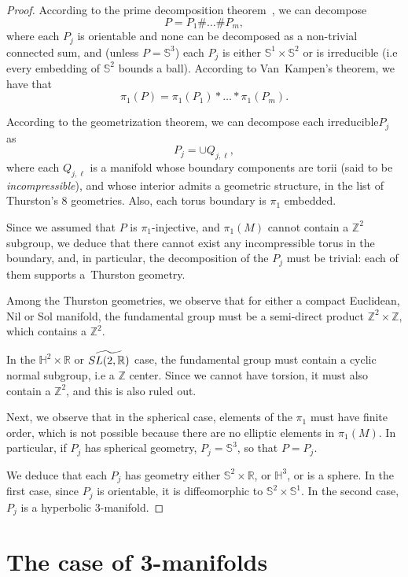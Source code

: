 \documentclass[AHL,Unicode,longabstracts,published]{cedram}
\newcommand{\R}{\mathbb{R}}
\newcommand{\Ss}{\mathbb{S}}
\newcommand{\Z}{\mathbb{Z}}
\newcommand{\Hh}{\mathbb{H}}
\theoremstyle{plain}
\let\oldtilde\tilde
\renewcommand*{\tilde}[1]{\mathchoice{\widetilde{#1}}{\widetilde{#1}}{\oldtilde{#1}}{\oldtilde{#1}}}
\begin{document}
\begin{proof}
According to the prime decomposition theorem~\cite{Milnor}, we can decompose
\[
P = P_1 \# \dots \# P_m,
\]
where each $P_j$ is orientable and none can be decomposed as a non-trivial connected sum, and (unless $P= \Ss^3$) each $P_j$ is either $\Ss^1\times\Ss^2$ or is irreducible (i.e every embedding of $\Ss^2$ bounds a ball). According to Van~Kampen's theorem, we have that
\[
\pi_1(P)= \pi_1(P_1)\ast \dots \ast \pi_1(P_m).
\]

According to the geometrization theorem, we can decompose each irreducible\linebreak $P_j$ as
\[
P_j = \cup Q_{j,\ell},
\]
where each $Q_{j,\ell}$ is a manifold whose boundary components are torii (said to be \emph{incompressible}), and whose interior admits a geometric structure, in the list of Thurston's 8 geometries. Also, each torus boundary is $\pi_1$ embedded.

Since we assumed that $P$ is $\pi_1$-injective, and $\pi_1(M)$ cannot contain a $\Z^2$ subgroup, we deduce that there cannot exist any incompressible torus in the boundary, and, in particular, the decomposition of the $P_j$ must be trivial: each of them supports a~Thurston geometry.

Among the Thurston geometries, we observe that for either a compact Euclidean, Nil or Sol manifold, the fundamental group must be a semi-direct product $\Z^2 \times \Z$, which contains a $\Z^2$.

In the $\Hh^2\times\R$ or $\tilde{SL(2,\R)}$ case, the fundamental group must contain a cyclic normal subgroup, i.e a $\Z$ center. Since we cannot have torsion, it must also contain a $\Z^2$, and this is also ruled out.

Next, we observe that in the spherical case, elements of the $\pi_1$ must have finite order, which is not possible because there are no elliptic elements in $\pi_1(M)$. In particular, if $P_j$ has spherical geometry, $P_j = \Ss^3$, so that $P=P_j$.


We deduce that each $P_j$ has geometry either $\Ss^2\times\R$, or $\Hh^3$, or is a sphere. In the first case, since $P_j$ is orientable, it is diffeomorphic to $\Ss^2 \times \Ss^1$. In the second case, $P_j$ is a hyperbolic $3$-manifold.
\end{proof}


\section{The case of 3-manifolds}\label{sec:3mfd}
\end{document}

